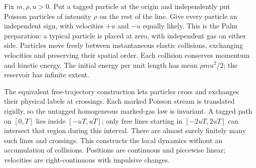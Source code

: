 \documentclass[11pt,a4paper]{article}
\begin{document}
Fix $m,\rho,u>0$. Put a tagged particle at the origin and independently put
Poisson particles of intensity $\rho$ on the rest of the line. Give every
particle an independent sign, with velocities $+u$ and $-u$ equally likely.
This is the Palm preparation: a typical particle is placed at zero, with
independent gas on either side. Particles move freely between instantaneous
elastic collisions, exchanging velocities and preserving their spatial order.
Each collision conserves momentum and kinetic energy. The initial energy
per unit length has mean $\rho m u^2/2$; the reservoir has infinite extent.

The equivalent free-trajectory construction lets particles cross and exchanges
their physical labels at crossings. Each marked Poisson stream is translated
rigidly, so the untagged homogeneous marked-gas law is invariant. A tagged
path on $[0,T]$ lies inside $[-uT,uT]$; only free lines starting in
$[-2uT,2uT]$ can intersect that region during this interval. There are almost
surely finitely many such lines and crossings. This constructs the local
dynamics without an accumulation of collisions. Positions are continuous
and piecewise linear; velocities are right-continuous with impulsive changes.
\end{document}
